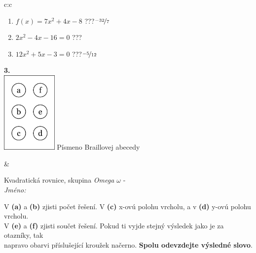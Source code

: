 \documentclass[10pt]{report}
\begin{document}
\begin{tabular}{c:c}
\begin{minipage}[c][104.5mm][t]{0.5\linewidth}
\begin{center}
\begin{minipage}{0.79\linewidth}
\begin{center}
\begin{varwidth}{\linewidth}
\begin{enumerate}
\item $f(x)=7x^2+4x-8$\quad \dotfill\; ???\;\dotfill \quad $\nicefrac{-32}{7}$
\item $2x^2-4x-16=0$\quad \dotfill\; ???\;\dotfill {}
\item $12x^2+5x-3=0$\quad \dotfill\; ???\;\dotfill \quad $\nicefrac{-5}{12}$
\end{enumerate}
\end{varwidth}
\end{center}
\end{minipage}
\begin{minipage}{0.20\linewidth}
\begin{center}
{\Huge\bfseries 3.} \\[2mm]
\includegraphics[height=40mm]{../images/braille.png}
{\small Písmeno Braillovej abecedy}
\end{center}
\end{minipage}
\end{center}
\end{minipage}
&
\begin{minipage}[c][104.5mm][t]{0.5\linewidth}
\begin{center}
\vspace{7mm}
{\huge Kvadratická rovnice, skupina \textit{Omega $\omega$} -}\\[5mm]
\textit{Jméno:}\phantom{xxxxxxxxxxxxxxxxxxxxxxxxxxxxxxxxxxxxxxxxxxxxxxxxxxxxxxxxxxxxxxxxx}\\[5mm]
\begin{minipage}{0.95\linewidth}
\begin{center}
V \textbf{(a)} a \textbf{(b)} zjisti počet řešení. V \textbf{(c)} x-ovú polohu vrcholu, a v \textbf{(d)} y-ovú polohu vrcholu.\\V \textbf{(e)} a \textbf{(f)} zjisti součet řešení. Pokud ti vyjde stejný výsledek jako je za otazníky, tak\\napravo obarvi příslušející kroužek načerno. \textbf{Spolu odevzdejte výsledné slovo}.
\end{center}
\end{minipage}
\\[1mm]

\end{center}
\end{minipage}
\end{tabular}
\end{document}
